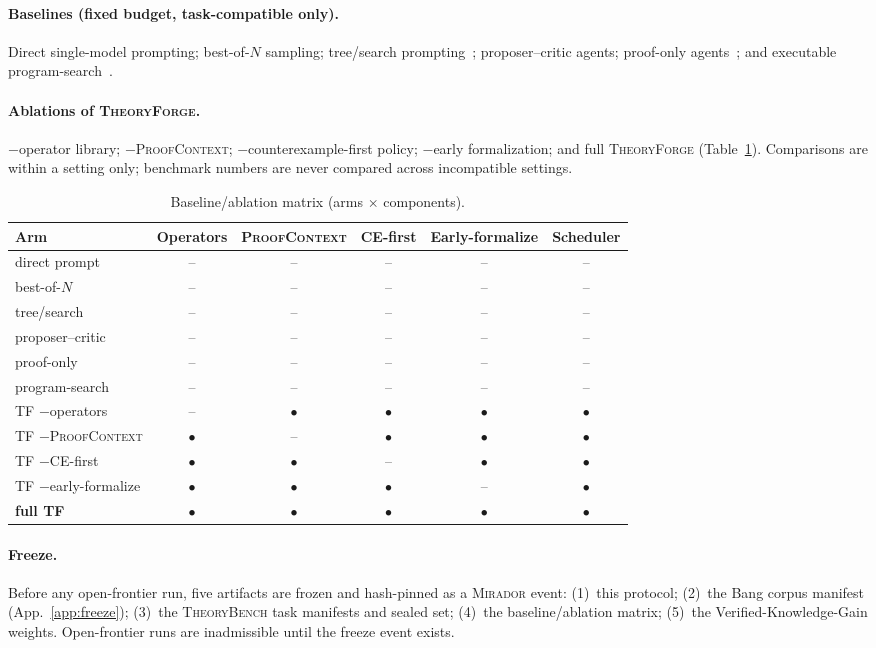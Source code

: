\documentclass[11pt]{amsart}
\theoremstyle{definition}
\theoremstyle{remark}
\newcommand{\mirador}{\textsc{Mirador}}
\newcommand{\pc}{\textsc{ProofContext}}
\newcommand{\tf}{\textsc{TheoryForge}}
\newcommand{\tb}{\textsc{TheoryBench}}
\newcommand{\yes}{$\bullet$}
\newcommand{\no}{--}
\begin{document}
\paragraph{Baselines (fixed budget, task-compatible only).} Direct single-model
prompting; best-of-$N$ sampling; tree/search prompting~\cite{Yao23};
proposer--critic agents; proof-only agents~\cite{QED26,RMA26}; and executable
program-search~\cite{RomeraParedes24}.

\paragraph{Ablations of \tf{}.} $-$operator library; $-$\pc{};
$-$counterexample-first policy; $-$early formalization; and full \tf{}
(Table~\ref{tab:ablation}). Comparisons are within a setting only; benchmark
numbers are never compared across incompatible settings.

\begin{table}[t]\small
\caption{Baseline/ablation matrix (arms $\times$ components).}\label{tab:ablation}
\begin{tabular}{@{}lccccc@{}}
\toprule
Arm & Operators & \pc{} & CE-first & Early-formalize & Scheduler\\
\midrule
direct prompt        & \no & \no & \no & \no & \no\\
best-of-$N$          & \no & \no & \no & \no & \no\\
tree/search          & \no & \no & \no & \no & \no\\
proposer--critic     & \no & \no & \no & \no & \no\\
proof-only           & \no & \no & \no & \no & \no\\
program-search       & \no & \no & \no & \no & \no\\
TF $-$operators      & \no & \yes & \yes & \yes & \yes\\
TF $-$\pc{}          & \yes & \no & \yes & \yes & \yes\\
TF $-$CE-first       & \yes & \yes & \no & \yes & \yes\\
TF $-$early-formalize& \yes & \yes & \yes & \no & \yes\\
\textbf{full TF}     & \yes & \yes & \yes & \yes & \yes\\
\bottomrule
\end{tabular}
\end{table}

\paragraph{Freeze.} Before any open-frontier run, five artifacts are frozen and
hash-pinned as a \mirador{} event: (1)~this protocol; (2)~the Bang corpus
manifest (App.~\ref{app:freeze}); (3)~the \tb{} task manifests and sealed set;
(4)~the baseline/ablation matrix; (5)~the Verified-Knowledge-Gain weights.
Open-frontier runs are inadmissible until the freeze event exists.
\end{document}
